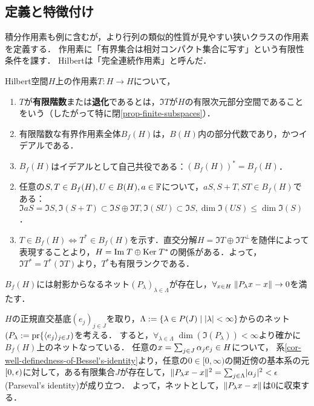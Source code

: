 \documentclass[uplatex,dvipdfmx]{jsreport}
\begin{document}
\subsection{定義と特徴付け}

\begin{tcolorbox}[colframe=ForestGreen, colback=ForestGreen!10!white,breakable,colbacktitle=ForestGreen!40!white,coltitle=black,fonttitle=\bfseries\sffamily,
title=]
    積分作用素も例に含むが，より行列の類似的性質が見やすい狭いクラスの作用素を定義する．
    作用素に「有界集合は相対コンパクト集合に写す」という有限性条件を課す．
    Hilbertは「完全連続作用素」と呼んだ．
\end{tcolorbox}

\begin{definition}
    Hilbert空間$H$上の作用素$T:H\to H$について，
    \begin{enumerate}
        \item $T$が\textbf{有限階数}または\textbf{退化}であるとは，$\Im T$が$H$の有限次元部分空間であることをいう（したがって特に閉\ref{prop-finite-subspaces}）．
        \item 有限階数な有界作用素全体$B_f(H)$は，$B(H)$内の部分代数であり，かつイデアルである．
        \item $B_f(H)$はイデアルとして自己共役である：$(B_f(H))^*=B_f(H)$．
    \end{enumerate}
\end{definition}
\begin{Proof}\mbox{}
    \begin{enumerate}\setcounter{enumi}{1}
        \item 任意の$S,T\in B_f(H),U\in B(H),a\in\mathbb{F}$について，$aS,S+T,ST\in B_f(H)$である：$\Im aS=\Im S,\Im(S+T)\subset\Im S\oplus\Im T,\Im(SU)\subset\Im S,\dim\Im(US)\le\dim\Im(S)$．
        \item $T\in B_f(H)\Leftrightarrow T^*\in B_f(H)$を示す．直交分解$H=\Im T\oplus\Im T^\perp$を随伴によって表現することより，$H=\mathrm{Im}\; T\oplus\mathrm{Ker}\; T^*$の関係がある．よって，$\Im T^*=T^*(\Im T)$より，$T^*$も有限ランクである．
    \end{enumerate}
\end{Proof}

\begin{lemma}[近似的単位元の構成]
    $B_f(H)$には射影からなるネット$(P_\lambda)_{\lambda\in\Lambda}$が存在し，$\forall_{x\in H}\;\|P_\lambda x-x\|\to 0$を満たす．
\end{lemma}
\begin{Proof}
    $H$の正規直交基底${(e_j)}_{j\in J}$を取り，$\Lambda:=\left\{\lambda\in P(J)\mid \lvert\lambda\rvert<\infty\right\}$からのネット$(P_\lambda:=\mathrm{pr}\{\langle e_j\rangle_{j\in J})$を考える．
    すると，$\forall_{\lambda\in\Lambda}\;\dim(\Im(P_\lambda))<\infty$より確かに$B_f(H)$上のネットなっている．
    任意の$x=\sum_{j\in J}\alpha_je_j\in H$について，
    系\ref{cor-well-definedness-of-Bessel's-identity}より，任意の$0\in[0,\infty)$の開近傍の基本系の元$[0,\epsilon)$に対して，ある有限集合$J$が存在して，$\|P_\lambda x-x\|^2=\sum_{j\in\Lambda}\lvert\alpha_j\rvert^2<\epsilon$(Parseval's identity)が成り立つ．
    よって，ネットとして，$\|P_\lambda x-x\|$は$0$に収束する．
\end{Proof}
\end{document}
